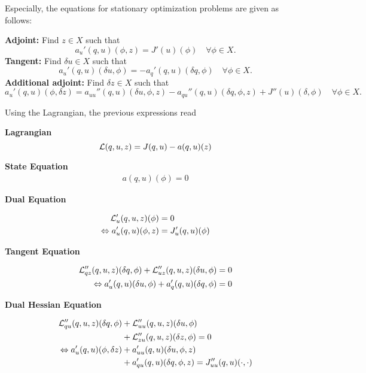 Especially, the equations for stationary optimization problems are
given as follows:

\textbf{Adjoint:} Find $z\in X$ such that
\begin{equation*}
a_u'(q,u)(\phi,z) = J'(u)(\phi) \quad \forall\phi\in X. 
\end{equation*}
\textbf{Tangent:} Find $\delta u\in X$ such that
\begin{equation*}
a_u'(q,u)(\delta u,\phi) = -a_q'(q,u)(\delta q,\phi)  \quad \forall\phi\in X. 
\end{equation*}
\textbf{Additional adjoint:} Find $\delta z\in X$ such that
\begin{equation*}
a_u'(q,u)(\phi,\delta z) = a_{uu}''(q,u)(\delta u,\phi,z)
-a_{qu}''(q,u)(\delta q,\phi,z) + J''(u)(\delta,\phi) \quad \forall\phi\in X. 
\end{equation*}


Using the Lagrangian, the previous expressions read


\textbf{Lagrangian}
\begin{equation*}
{\cal L}(q,u,z) =J(q,u) - a(q,u)(z)
\end{equation*}

\textbf{State Equation}
\begin{align*}
a(q,u)(\phi) = 0 
\end{align*}


\textbf{Dual Equation}

\begin{align*}
{\cal L}_{u}' (q,u,z)(\phi ) &= 0 \\
\Leftrightarrow a_u' (q,u)(\phi,z) &= J_u' (q,u)(\phi)
\end{align*}

\textbf{Tangent Equation}

\begin{align*}
{\cal L}_{qz}'' (q,u,z)(\delta q, \phi) 
+ {\cal L}_{uz}'' (q,u,z)(\delta u, \phi) &= 0 \\
\Leftrightarrow a_u' (q,u)(\delta u,\phi) + a_q' (q,u)(\delta q,\phi) &= 0
\end{align*}

\textbf{Dual Hessian Equation}

\begin{align*}
{\cal L}_{qu}'' (q,u,z)(\delta q, \phi) 
&+ {\cal L}_{uu}'' (q,u,z)(\delta u, \phi) \\
&+ {\cal L}_{zu}'' (q,u,z)(\delta z, \phi) = 0 \\
\Leftrightarrow a_u' (q,u)(\phi, \delta z) 
&+ a_{uu}' (q,u)(\delta u,\phi, z) \\
&+ a_{qu}' (q,u)(\delta q,\phi, z)  = J_{uu}''(q,u)(\cdot ,\cdot )
\end{align*}

